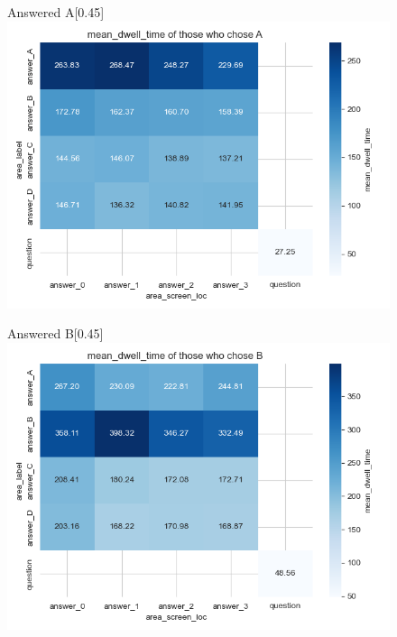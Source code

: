 \documentclass[manuscript,review,anonymous]{acmart}
\begin{document}
        \begin{figure}[htbp]
          \centering
          \begin{subcaptionbox}{Answered A\label{fig:A6}}[0.45\textwidth]
            {\centering\includegraphics[width=\linewidth]{plots/matrix_plots/matrix_mean_dwell_time_A_gatherers.png}}
          \end{subcaptionbox}
          \hfill
          \begin{subcaptionbox}{Answered B\label{fig:B6}}[0.45\textwidth]
            {\centering\includegraphics[width=\linewidth]{plots/matrix_plots/matrix_mean_dwell_time_B_gatherers.png}}
          \end{subcaptionbox}
          

\end{figure}
\end{document}
